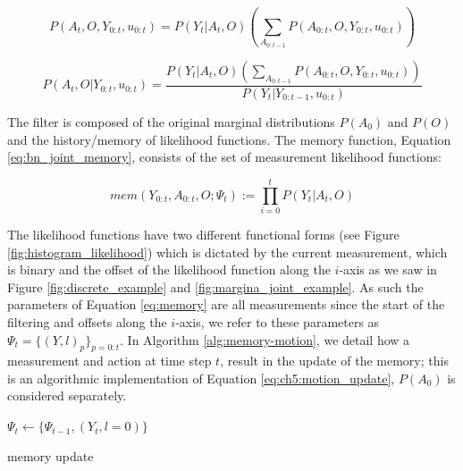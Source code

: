 \begin{equation}
 P(A_t,O,Y_{0:t},u_{0:t}) = P(Y_t|A_t,O) \left( \sum_{A_{0:t-1}} P(A_{0:t},O,Y_{0:t},u_{0:t})  \right)  \label{eq:ch5:motion_update}
\end{equation}

\begin{equation}
  P(A_t,O|Y_{0:t},u_{0:t}) = \frac{P(Y_t|A_t,O) \left( \sum_{A_{0:t-1}} P(A_{0:t},O,Y_{0:t},u_{0:t})  \right)}{P(Y_t|Y_{0:t-1},u_{0:t}) } \label{eq:joint_filter_memory}
\end{equation}

The filter is composed of the original marginal distributions $P(A_0)$ and $P(O)$ and the history/memory of likelihood functions. 
The memory function, Equation \ref{eq:bn_joint_memory}, consists of the set of measurement likelihood functions: 

\begin{equation}
 mem(Y_{0:t},A_{0:t},O;\Psi_t) := \prod_{i=0}^t P(Y_t|A_t,O) \label{eq:memory}
\end{equation}

The likelihood functions have two different functional forms (see Figure \ref{fig:histogram_likelihood}) which is dictated 
by the current measurement, which is binary and the offset of the likelihood function along the $i$-axis as we saw in
Figure \ref{fig:discrete_example} and \ref{fig:margina_joint_example}. As such the parameters of Equation \ref{eq:memory}
are all measurements since the start of the filtering and offsets along the $i$-axis, we refer to these parameters
as $\Psi_t = \{(Y,l)_p\}_{p=0:t}$. In Algorithm \ref{alg:memory-motion}, we detail how a measurement and action at 
time step $t$, result in the update of the memory; this is an algorithmic implementation of Equation  \ref{eq:ch5:motion_update},
$P(A_0)$ is considered separately.

\begin{center}
\begin{minipage}{.55\linewidth}

\begin{algorithm}[H]

\BlankLine
{}
$\Psi_t \gets \{\Psi_{t-1}, (Y_t,l=0)\}$ 

\caption{memory update}

\end{algorithm} \label{alg:memory-motion}
\end{minipage}
\end{center}

